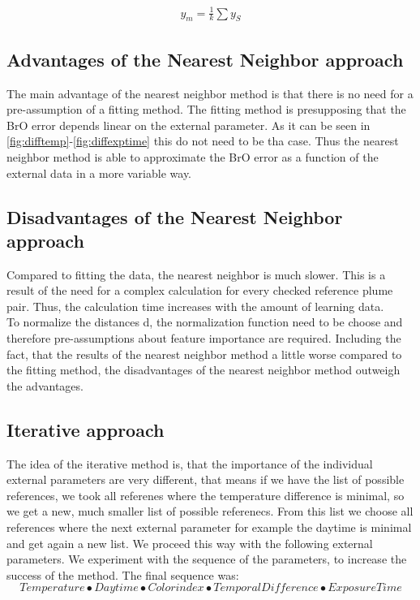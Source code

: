 \documentclass  [
  paper    = a4,
  BCOR     = 10mm,
  twoside,
  fontsize = 12pt,
  fleqn,
  toc      = bibnumbered,
  toc      = listofnumbered,
  numbers  = noendperiod,
  headings = normal,
  listof   = leveldown,
  version  = 3.03
]                                       {scrreprt}
\begin{document}
%

\begin{align}
y_m = \frac{1}{k} \sum y_S \label{eq:knn_regression}
\end{align}

%

\subsection*{Advantages of the Nearest Neighbor approach}
	The main advantage of the nearest neighbor method is that there is no need for a pre-assumption of a fitting method. The fitting method is presupposing that the BrO error depends linear on the external parameter. As it can be seen in \cref{fig:difftemp}-\cref{fig:diffexptime} this do not need to be tha case. Thus the nearest neighbor method is able to approximate the BrO error as a function of the external data in a more variable way.
%
\subsection*{Disadvantages of the Nearest Neighbor approach}
	Compared to fitting the data, the nearest neighbor is much slower. This is a result of the need for a complex calculation for every checked reference plume pair. Thus, the calculation time increases with the amount of learning data.\\
	To normalize the distances d, the normalization function need to be choose and therefore pre-assumptions about feature importance are required.
	Including the fact, that the results of the nearest neighbor method a little worse compared to the fitting method, the disadvantages of the nearest neighbor method outweigh the advantages.

	\subsection{Iterative approach}

	The idea of the iterative method is, that the importance of the individual external parameters are very different, that means if we have the list of possible references, we took all referenes where the temperature difference is minimal, so we get a new, much smaller list of possible referenecs. From this list we choose all references where the next external parameter for example the daytime is minimal and get again a new list. We proceed this way with the following external parameters. We experiment with the sequence of the parameters, to increase the success of the method. The final sequence was:
	\begin{equation*}
	Temperature \bullet  Daytime  \bullet Colorindex \bullet Temporal Difference \bullet Exposure Time
	\end{equation*} 
	
\end{document}
